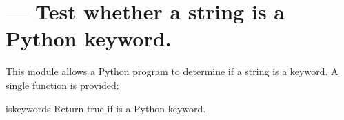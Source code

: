 \section{ ---
         Test whether a string is a Python keyword.}



This module allows a Python program to determine if a string is a
keyword.  A single function is provided:

\begin{funcdesc}{iskeyword}{s}
Return true if  is a Python keyword.
\end{funcdesc}
